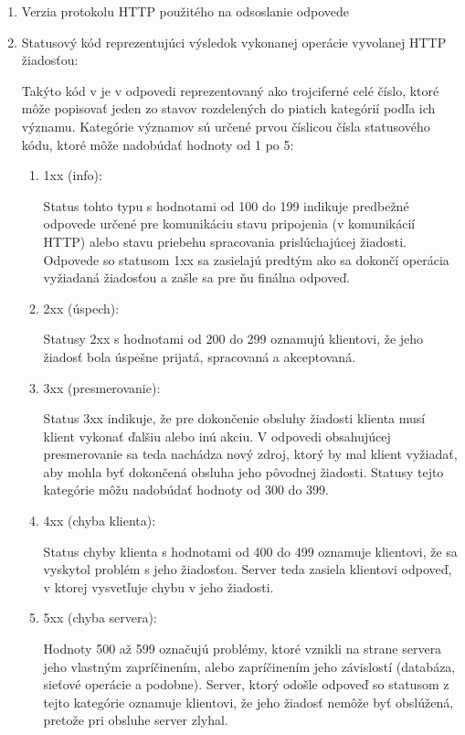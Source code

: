 \begin{enumerate}
    \item Verzia protokolu HTTP použitého na odsoslanie odpovede

    \item Statusový kód reprezentujúci výsledok vykonanej operácie vyvolanej HTTP žiadosťou:

    Takýto kód v je v odpovedi reprezentovaný ako trojciferné celé číslo, ktoré môže popisovať jeden
    zo stavov rozdelených do piatich kategórií podľa ich významu. 
    Kategórie významov sú určené prvou číslicou čísla statusového kódu, ktoré môže nadobúdať hodnoty od 1 po 5:

    \begin{enumerate}
        \item 1xx (info):
        
        Status tohto typu s hodnotami od 100 do 199 indikuje predbežné odpovede určené pre komunikáciu stavu pripojenia (v komunikácií HTTP) alebo stavu priebehu spracovania prislúchajúcej žiadosti.
        Odpovede so statusom 1xx sa zasielajú predtým ako sa dokončí operácia vyžiadaná žiadosťou a zašle sa pre ňu finálna odpoveď.
        
        \item 2xx (úspech):
        
        Statusy 2xx s hodnotami od 200 do 299 oznamujú klientovi, že jeho žiadosť bola úspešne prijatá, spracovaná a akceptovaná. 
        
        \item 3xx (presmerovanie):
        
        Status 3xx indikuje, že pre dokončenie obsluhy žiadosti klienta musí klient vykonať ďalšiu alebo inú akciu.
        V odpovedi obsahujúcej presmerovanie sa teda nachádza nový zdroj, ktorý by mal klient vyžiadať, aby mohla byť dokončená obsluha jeho pôvodnej žiadosti. 
        Statusy tejto kategórie môžu nadobúdať hodnoty od 300 do 399.
        
        \item 4xx (chyba klienta):

        Status chyby klienta s hodnotami od 400 do 499 oznamuje klientovi, že sa vyskytol problém s jeho žiadosťou.
        Server teda zasiela klientovi odpoveď, v ktorej vysvetľuje chybu v jeho žiadosti.
        
        \item 5xx (chyba servera):

        Hodnoty 500 až 599 označujú problémy, ktoré vznikli na strane servera jeho vlastným zapríčinením, alebo zapríčinením jeho závislostí (databáza, sieťové operácie a podobne).
        Server, ktorý odošle odpoveď so statusom z tejto kategórie oznamuje klientovi, že jeho žiadosť nemôže byť obslúžená, pretože pri obsluhe server zlyhal.
    \end{enumerate}


\end{enumerate}
